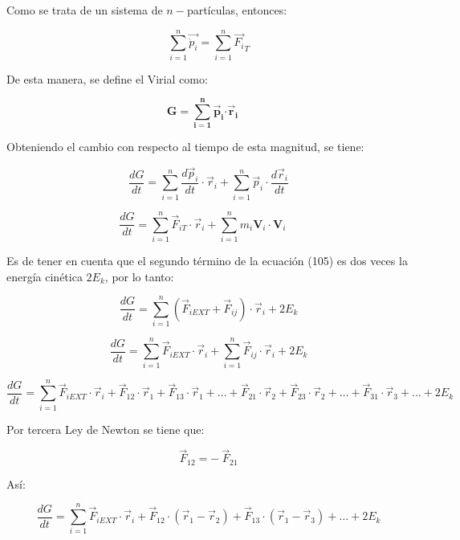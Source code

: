 \documentclass[]{article}
\begin{document}
Como se trata de un sistema de \(n -\)partículas, entonces:

\[\sum_{i = 1}^{n}\overrightarrow{{\dot{p}}_{i}} = \sum_{i = 1}^{n}{\overrightarrow{F_{i}}}_{T}\]

De esta manera, se define el Virial como:

\[\mathbf{G =}\sum_{\mathbf{i = 1}}^{\mathbf{n}}{{\overrightarrow{\mathbf{p}}}_{\mathbf{i}}\mathbf{\cdot}}{\overrightarrow{\mathbf{r}}}_{\mathbf{i}}\mathbf{\ \ \ \ \ }\]

Obteniendo el cambio con respecto al tiempo de esta magnitud, se tiene:

\[\frac{dG}{dt} = \sum_{i = 1}^{n}{\frac{{d\overrightarrow{p}}_{i}}{dt} \cdot}{\overrightarrow{r}}_{i} + \sum_{i = 1}^{n}{\overrightarrow{p}}_{i} \cdot \frac{{d\overrightarrow{r}}_{i}}{dt}\]

\[\frac{dG}{dt} = \sum_{i = 1}^{n}{{\overrightarrow{F}}_{iT} \cdot}{\overrightarrow{r}}_{i} + \sum_{i = 1}^{n}m_{i}\mathbf{V}_{i} \cdot \mathbf{V}_{i}\ \ \ \ \ \]

Es de tener en cuenta que el segundo término de la ecuación (105) es dos
veces la energía cinética \(2E_{k}\), por lo tanto:

\[\frac{dG}{dt} = \sum_{i = 1}^{n}{\left( {\overrightarrow{F}}_{iEXT} + {\overrightarrow{F}}_{ij} \right) \cdot}{\overrightarrow{r}}_{i} + 2E_{k}\]

\[\frac{dG}{dt} = \sum_{i = 1}^{n}{{\overrightarrow{F}}_{iEXT} \cdot}{\overrightarrow{r}}_{i} + \sum_{i = 1}^{n}{{\overrightarrow{F}}_{ij} \cdot}{\overrightarrow{r}}_{i} + 2E_{k}\]

\[\frac{dG}{dt} = \sum_{i = 1}^{n}{{\overrightarrow{F}}_{iEXT} \cdot}{\overrightarrow{r}}_{i} + {\overrightarrow{F}}_{12} \cdot {\overrightarrow{r}}_{1} + {\overrightarrow{F}}_{13} \cdot {\overrightarrow{r}}_{1} + \ldots + {\overrightarrow{F}}_{21} \cdot {\overrightarrow{r}}_{2} + {\overrightarrow{F}}_{23} \cdot {\overrightarrow{r}}_{2} + \ldots + {\overrightarrow{F}}_{31} \cdot {\overrightarrow{r}}_{3} + \ldots + 2E_{k}\]

Por tercera Ley de Newton se tiene que:

\[{\overrightarrow{F}}_{12} = - \ {\overrightarrow{F}}_{21}\]

Así:

\[\frac{dG}{dt} = \sum_{i = 1}^{n}{{\overrightarrow{F}}_{iEXT} \cdot}{\overrightarrow{r}}_{i} + {\overrightarrow{F}}_{12} \cdot \left( {\overrightarrow{r}}_{1} - {\overrightarrow{r}}_{2} \right) + {\overrightarrow{F}}_{13} \cdot \left( {\overrightarrow{r}}_{1} - {\overrightarrow{r}}_{3} \right) + \ldots + 2E_{k}\]
\end{document}
